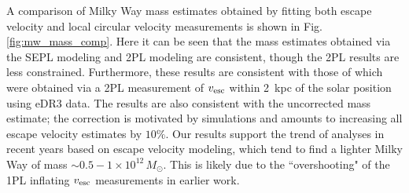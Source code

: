 A comparison of Milky Way mass estimates obtained by fitting both escape velocity and local circular velocity measurements is shown in Fig. \ref{fig:mw_mass_comp}. Here it can be seen that the mass estimates obtained via the SEPL modeling and 2PL modeling are consistent, though the 2PL results are less constrained. Furthermore, these results are consistent with those of \cite{Necib2022} which were obtained via a 2PL measurement of $v_{\rm{esc}}$ within 2~kpc of the solar position using \Gaia eDR3 data. The results are also consistent with the uncorrected \cite{Koppelman2021} mass estimate; the correction is motivated by simulations and amounts to increasing all escape velocity estimates by $10\%$. Our results support the trend of  analyses in recent years based on escape velocity modeling, which tend to find a lighter Milky Way of mass $\sim 0.5-1\times 10^{12}\,M_\odot$. This is likely due to the ``overshooting" of the 1PL inflating $v_{\rm{esc}}$ measurements in earlier work.


